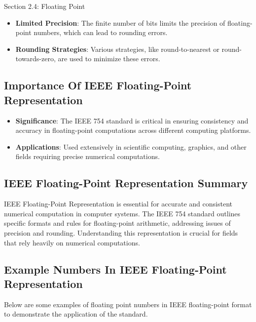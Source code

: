 \begin{notes}{Section 2.4: Floating Point}
    \begin{itemize}
        \item \textbf{Limited Precision}: The finite number of bits limits the precision of floating-point numbers, which can lead to rounding errors.
        \item \textbf{Rounding Strategies}: Various strategies, like round-to-nearest or round-towards-zero, are used to minimize these errors.
    \end{itemize}
    
    \subsection*{Importance Of IEEE Floating-Point Representation}
    
    \begin{itemize}
        \item \textbf{Significance}: The IEEE 754 standard is critical in ensuring consistency and accuracy in floating-point computations across different computing platforms.
        \item \textbf{Applications}: Used extensively in scientific computing, graphics, and other fields requiring precise numerical computations.
    \end{itemize}
    
    \subsection*{IEEE Floating-Point Representation Summary}
    
    IEEE Floating-Point Representation is essential for accurate and consistent numerical computation in computer systems. The IEEE 754 standard outlines specific formats and rules for floating-point 
    arithmetic, addressing issues of precision and rounding. Understanding this representation is crucial for fields that rely heavily on numerical computations. \vspace*{1em}

    \subsection*{Example Numbers In IEEE Floating-Point Representation}

    Below are some examples of floating point numbers in IEEE floating-point format to demonstrate the application of the standard.


\end{notes}
